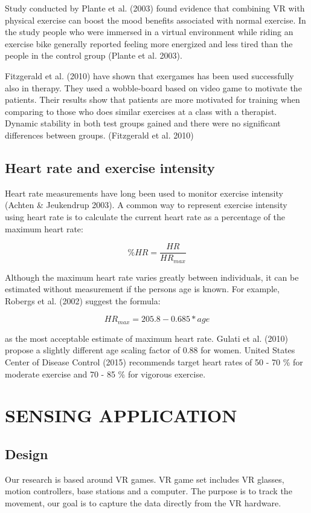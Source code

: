 \documentclass{sig-alternate-05-2015}
\begin{document}
Study conducted by Plante et al. (2003) found evidence that combining 
VR with physical exercise can boost the mood benefits associated with 
normal exercise. In the study people who were immersed in a virtual 
environment while riding an exercise bike generally reported feeling 
more energized and less tired than the people in the control group 
(Plante et al. 2003). 

Fitzgerald et al. (2010) have shown that exergames has been used successfully 
also in therapy. They used a wobble-board based on video game to motivate 
the patients. Their results show that patients are more motivated for 
training when comparing to those who does similar exercises at a class 
with a therapist. Dynamic stability in both test groups gained and there 
were no significant differences between groups. (Fitzgerald et al. 2010)

\subsection{Heart rate and exercise intensity}
Heart rate measurements have long been used to monitor exercise intensity 
(Achten \& Jeukendrup 2003). A common way to represent exercise intensity 
using heart rate is to calculate the current heart rate as a percentage 
of the maximum heart rate: 

\begin{equation}\%HR = \frac{HR}{HR_{max}}\end{equation}

Although the maximum heart rate varies greatly between individuals, 
it can be estimated without measurement if the persons age is known. 
For example, Robergs et al. (2002) suggest the formula:

\begin{equation}HR_{max} = 205.8 - 0.685 * age\end{equation}

as the most acceptable estimate of maximum heart rate. Gulati et al. 
(2010) propose a slightly different age scaling factor of 0.88 for women. 
United States Center of Disease Control (2015) recommends target heart 
rates of 50 - 70 \% for moderate exercise and 70 - 85 \% for vigorous 
exercise.

\section{SENSING APPLICATION}
\subsection{Design}
Our research is based around VR games. VR game set includes VR glasses, 
motion controllers, base stations and a computer. The purpose is to track 
the movement, our goal is to capture the data directly from the VR 
hardware. 
\end{document}
